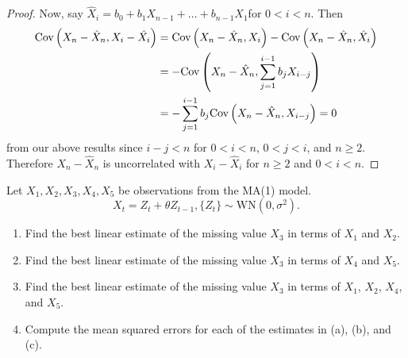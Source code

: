 \documentclass[12pt]{article}
\theoremstyle{definition}
\newenvironment{custompbm}[1]
  {\renewcommand\theproblem{#1}\problem}
  {\endproblem}
\newcommand{\Co}[2]{\text{Cov}\left({#1}, {#2}\right)}
\begin{document}
\begin{proof}
  Now, say $\hat{X}_i = b_0 + b_1 X_{n-1} + \dots + b_{n-1}X_{1}$for $0 < i < n$. Then
  \begin{align*}
    \Co{X_n - \hat{X}_n}{X_i - \hat{X_i}} &= \Co{X_n - \hat{X}_n}{X_i} - \Co{X_n - \hat{X}_n}{\hat{X}_i} \\
    &= -\Co{X_n - \hat{X}_n}{\sum_{j=1}^{i-1} b_j X_{i-j}} \notag\\
    &= -\sum_{j=1}^{i-1} b_j \Co{X_n - \hat{X}_n}{X_{i-j}} = 0 \notag \\
  \end{align*}
  from our above results since $i - j < n$ for $0 < i < n$, $0 < j < i$, and $n \geq 2$.
  Therefore $X_n - \hat{X}_n$ is uncorrelated with $X_i - \hat{X}_i$ for $n\geq 2$ and $0 < i < n$.


\end{proof}


\begin{custompbm}{2.21}
  Let $X_1, X_2, X_3, X_4, X_5$ be observations from the MA(1) model.
  \[
    X_t = Z_t + \theta Z_{t-1}, \{Z_t\} \sim \text{WN}(0, \sigma^2).
  \]
  \begin{enumerate}
    \item Find the best linear estimate of the missing value $X_3$ in terms of
      $X_1$ and $X_2$.
    \item Find the best linear estimate of the missing value $X_3$ in terms of
      $X_4$ and $X_5$.
    \item Find the best linear estimate of the missing value $X_3$ in terms of
      $X_1$, $X_2$, $X_4$, and $X_5$.
    \item Compute the mean squared errors for each of the estimates in (a),
      (b), and (c).
  \end{enumerate}
\end{custompbm}
\end{document}
